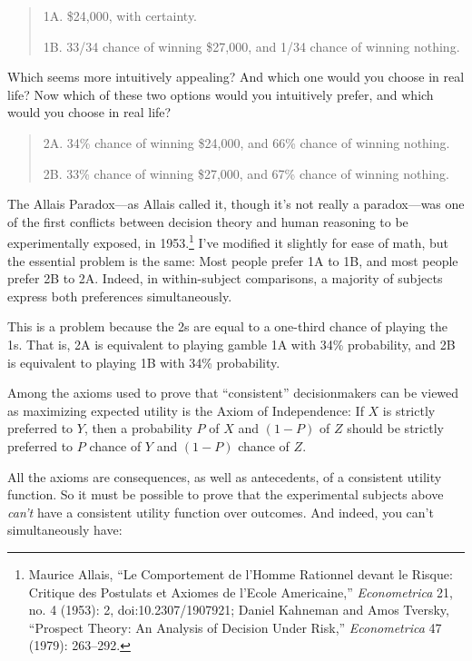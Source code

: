 \begin{quote}

 1A. \$24,000, with certainty.

{
 1B. 33/34 chance of winning \$27,000, and 1/34 chance of winning
 nothing.}
\end{quote}


 Which seems more intuitively appealing? And which one would you
choose in real life? Now which of these two options would you
intuitively prefer, and which would you choose in real life?

\begin{quote}

 2A. 34\% chance of winning \$24,000, and 66\% chance of winning
nothing.

{
 2B. 33\% chance of winning \$27,000, and 67\% chance of winning
 nothing.}
\end{quote}


 The Allais Paradox---as Allais called it, though
it's not really a paradox---was one of the first
conflicts between decision theory and human reasoning to be
experimentally exposed, in 1953.\footnote{Maurice Allais, ``Le Comportement de
l'Homme Rationnel devant le Risque: Critique des
Postulats et Axiomes de l'Ecole
Americaine,'' \textit{Econometrica} 21, no. 4 (1953):
2, doi:10.2307/1907921; Daniel Kahneman and Amos Tversky,
``Prospect Theory: An Analysis of Decision Under
Risk,'' \textit{Econometrica} 47 (1979): 263--292.}
I've modified it slightly for ease of math, but the
essential problem is the same: Most people prefer 1A to 1B, and most
people prefer 2B to 2A. Indeed, in within-subject comparisons, a
majority of subjects express both preferences simultaneously.


 This is a problem because the 2s are equal to a one-third chance
of playing the 1s. That is, 2A is equivalent to playing gamble 1A with
34\% probability, and 2B is equivalent to playing 1B with 34\%
probability.


 Among the axioms used to prove that
``consistent'' decisionmakers can be
viewed as maximizing expected utility is the Axiom of Independence: If
$X$ is strictly preferred to $Y$, then a probability $P$ of $X$ and $(1 - P)$ of
$Z$ should be strictly preferred to $P$ chance of $Y$ and $(1 - P)$ chance of
$Z$.


 All the axioms are consequences, as well as antecedents, of a
consistent utility function. So it must be possible to prove that the
experimental subjects above \textit{can't} have a
consistent utility function over outcomes. And indeed, you
can't simultaneously have:


